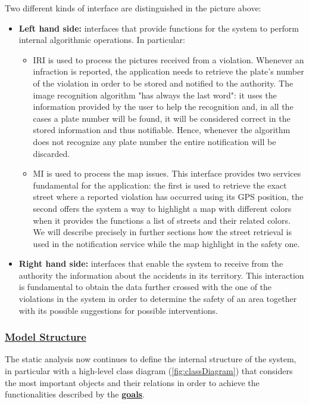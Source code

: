 		Two different kinds of interface are distinguished in the picture above:
		\begin{itemize}
			\item \textbf{Left hand side:} interfaces that provide functions for the system to perform internal algorithmic operations. In particular:
			\begin{itemize}
				\item \textsc{IRI} is used to process the pictures received from a violation. Whenever an infraction is reported, the application needs to retrieve the plate's number of the violation in order to be stored and notified to the authority. The image recognition algorithm "has always the last word": it uses the information provided by the user to help the recognition and, in all the cases a plate number will be found, it will be considered correct in the stored information and thus notifiable. Hence, whenever the algorithm does not recognize any plate number the entire notification will be discarded.
			
				\item \textsc{MI} is used to process the map issues. This interface provides two services fundamental for the application: the first is used to retrieve the exact street where a reported violation has occurred using its GPS position, the second offers the system a way to highlight a map with different colors when it provides the functions a list of streets and their related colors. We will describe precisely in further sections how the street retrieval is used in the notification service while the map highlight in the safety one.
			\end{itemize}
			
			\item \textbf{Right hand side:} interfaces that enable the system to receive from the authority the information about the accidents in its territory. This interaction is fundamental to obtain the data further crossed with the one of the violations in the system in order to determine the safety of an area together with its possible suggestions for possible interventions.
			
		\end{itemize}
	
	\subsubsection[Model Structure]{\hyperlink{toc}{Model Structure}}
	The static analysis now continues to define the internal structure of the system, in particular with a high-level class diagram (\autoref{fig:classDiagram}) that considers the most important objects and their relations in order to achieve the functionalities described by the \hyperref[sec:goals]{\textbf{goals}}.\\
	
